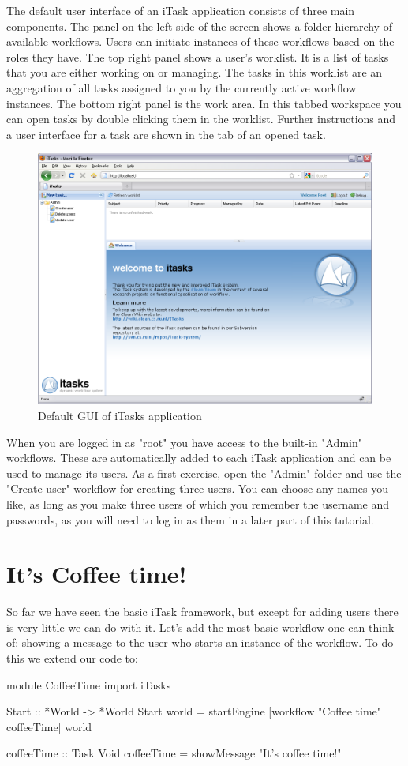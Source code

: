 \documentclass[a4paper,11pt]{article}
\begin{document}
The default user interface of an iTask application consists of three main components. The panel on the left side of the screen shows a folder hierarchy of available workflows. Users can initiate instances of these workflows based on the roles they have. The top right panel shows a user's worklist. It is a list of tasks that you are either working on or managing. The tasks in this worklist are an aggregation of all tasks assigned to you by the currently active workflow instances. The bottom right panel is the work area. In this tabbed workspace you can open tasks by double clicking them in the worklist. Further instructions and a user interface for a task are shown in the tab of an opened task.
\begin{figure}[h]
\centerline{\includegraphics[width=12cm]{GettingStarted-img/empty-browser.png}}
\caption{Default GUI of iTasks application} \label{empty-browser}
\end{figure}

When you are logged in as "root" you have access to the built-in "Admin" workflows. These are automatically added to each iTask application and can be used to manage its users. As a first exercise, open the "Admin" folder and use the "Create user" workflow for creating three users. You can choose any names you like, as long as you make three users of which you remember the username and passwords, as you will need to log in as them in a later part of this tutorial.

\section{It's Coffee time!}
So far we have seen the basic iTask framework, but except for adding users there is very little we can do with it. Let's add the most basic workflow one can think of: showing a message to the user who starts an instance of the workflow.
To do this we extend our code to:
\begin{CleanCode}
module CoffeeTime
import iTasks

Start :: *World -> *World
Start world = startEngine [workflow "Coffee time" coffeeTime] world

coffeeTime :: Task Void
coffeeTime = showMessage "It's coffee time!"
\end{CleanCode}
\end{document}
